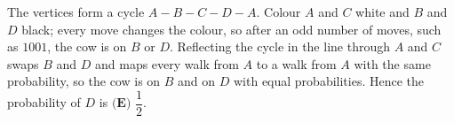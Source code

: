 The vertices form a cycle $A-B-C-D-A$. Colour $A$ and $C$ white and $B$ and $D$ black; every move changes the colour, so after an odd number of moves, such as $1001$, the cow is on $B$ or $D$. Reflecting the cycle in the line through $A$ and $C$ swaps $B$ and $D$ and maps every walk from $A$ to a walk from $A$ with the same probability, so the cow is on $B$ and on $D$ with equal probabilities. Hence the probability of $D$ is $\boxed{\textbf{(E) }\dfrac12}$.
